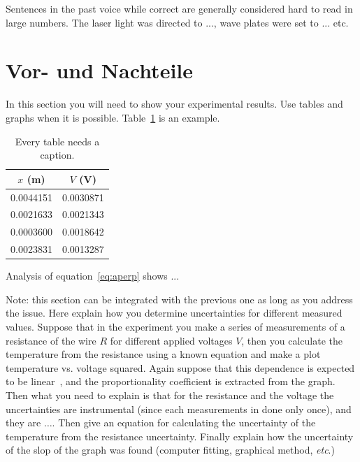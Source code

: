 \documentclass[letterpaper,12pt]{article}
\begin{document}
	Sentences in the past voice while correct are generally considered hard to read
	in large numbers. The laser light was directed to ..., wave plates were set
	to ... etc.
	
	
	\section{Vor- und Nachteile}
	
	In this section you will need to show your experimental results. Use tables and
	graphs when it is possible. Table~\ref{tbl:bins} is an example.
	
	\begin{table}[ht]
		\begin{center}
			\caption{Every table needs a caption.}
			\label{tbl:bins} %
			\begin{tabular}{|cc|} 
				\hline
				\multicolumn{1}{|c}{$x$ (m)} & \multicolumn{1}{c|}{$V$ (V)} \\
				\hline
				0.0044151 &   0.0030871 \\
				0.0021633 &   0.0021343 \\
				0.0003600 &   0.0018642 \\
				0.0023831 &   0.0013287 \\
				\hline
			\end{tabular}
		\end{center}
	\end{table}
	
	Analysis of equation~\ref{eq:aperp} shows ...
	
	Note: this section can be integrated with the previous one as long as you
	address the issue. Here explain how you determine uncertainties for different
	measured values. Suppose that in the experiment you make a series of
	measurements of a resistance of the wire $R$ for different applied voltages
	$V$, then you calculate the temperature from the resistance using a known
	equation and make a plot  temperature vs. voltage squared. Again suppose that
	this dependence is expected to be linear~\cite{Cyr}, and the proportionality coefficient
	is extracted from the graph. Then what you need to explain is that for the
	resistance and the voltage the uncertainties are instrumental (since each
	measurements in done only once), and they are $\dots$. Then give an equation
	for calculating the uncertainty of the temperature from the resistance
	uncertainty. Finally explain how the uncertainty of the slop of the graph was
	found (computer fitting, graphical method, \emph{etc}.)
	
\end{document}
